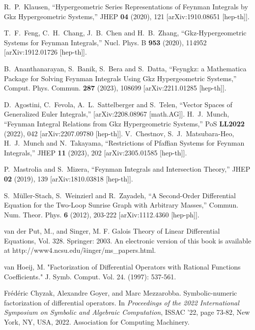 \documentclass[a4paper,12pt]{article}
\numberwithin{equation}{section}
\numberwithin{figure}{section}
\begin{document}
\begin{thebibliography}{99}
R.~P.~Klausen,
``Hypergeometric Series Representations of Feynman Integrals by Gkz Hypergeometric Systems,''
JHEP \textbf{04} (2020), 121
[arXiv:1910.08651 [hep-th]].
  
T.~F.~Feng, C.~H.~Chang, J.~B.~Chen and H.~B.~Zhang,
``Gkz-Hypergeometric Systems for Feynman Integrals,''
Nucl. Phys. B \textbf{953} (2020), 114952
[arXiv:1912.01726 [hep-th]].

B.~Ananthanarayan, S.~Banik, S.~Bera and S.~Datta,
``Feyngkz: a Mathematica Package for Solving Feynman Integrals Using Gkz Hypergeometric Systems,''
Comput. Phys. Commun. \textbf{287} (2023), 108699
[arXiv:2211.01285 [hep-th]].

D.~Agostini, C.~Fevola, A.~L.~Sattelberger and S.~Telen,
``Vector Spaces of Generalized Euler Integrals,''
[arXiv:2208.08967 [math.AG]].
H.~J.~Munch,
``Feynman Integral Relations from Gkz Hypergeometric Systems,''
PoS \textbf{LL2022} (2022), 042
[arXiv:2207.09780 [hep-th]].
V.~Chestnov, S.~J.~Matsubara-Heo, H.~J.~Munch and N.~Takayama,
``Restrictions of Pfaffian Systems for Feynman Integrals,''
JHEP \textbf{11} (2023), 202
[arXiv:2305.01585 [hep-th]].

P.~Mastrolia and S.~Mizera,
``Feynman Integrals and Intersection Theory,''
JHEP \textbf{02} (2019), 139
[arXiv:1810.03818 [hep-th]].

S.~M\"uller-Stach, S.~Weinzierl and R.~Zayadeh,
``A Second-Order Differential Equation for the Two-Loop Sunrise Graph with Arbitrary Masses,''
Commun. Num. Theor. Phys. \textbf{6} (2012), 203-222
[arXiv:1112.4360 [hep-ph]].

  
 van der Put, M., and Singer, M. F. Galois Theory of Linear Differential Equations, Vol. 328. Springer: 2003. An electronic version of this book is available at http://www4.ncsu.edu/\~singer/ms\_papers.html.

  van Hoeij, M. "Factorization of Differential Operators with Rational Functions Coefficients." J. Symb. Comput. Vol. 24. (1997): 537-561.

Fr\'{e}d\'{e}ric Chyzak, Alexandre Goyer, and Marc Mezzarobba.
\newblock Symbolic-numeric factorization of differential operators.
\newblock In {\em Proceedings of the 2022 International Symposium on Symbolic
  and Algebraic Computation}, ISSAC '22, page 73-82, New York, NY, USA, 2022.
Association for Computing Machinery.
\newblock [arXiv:2205.08991]


\end{thebibliography}
\end{document}
